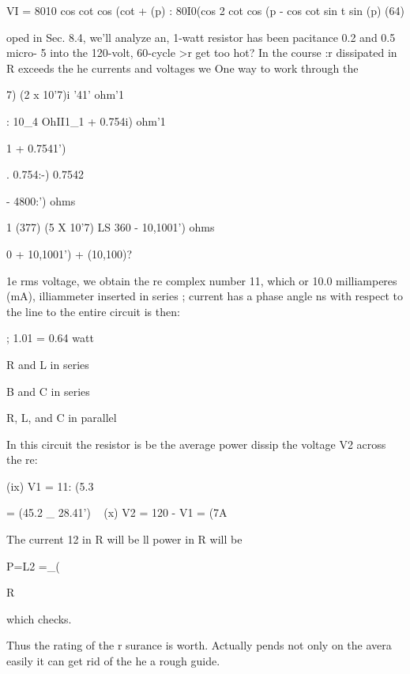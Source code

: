 \begin{equation}
\end{equation}
VI = 8010 cos cot cos (cot + (p)
: 80I0(cos 2 cot cos (p - cos cot sin \omega t sin (p) (64)

oped in Sec. 8.4, we'll analyze
an, 1-watt resistor has been
pacitance 0.2 and 0.5 micro-
5 into the 120-volt, 60-cycle
>r get too hot? In the course
:r dissipated in R exceeds the
he currents and voltages we
One way to work through the

7) (2 x 10'7)i
'41' ohm'1

: 10_4 OhII1_1
+ 0.754i) ohm'1

1
+ 0.7541')

. 0.754:-)
0.7542

- 4800:') ohms

1
(377) (5 X 10'7)
LS
360 - 10,1001') ohms

0 + 10,1001')
+ (10,100)?

1e rms voltage, we obtain the
re complex number 11, which
or 10.0 milliamperes (mA),
illiammeter inserted in series
; current has a phase angle
ns with respect to the line
to the entire circuit is then:

; 1.01 = 0.64 watt

R and L in series

B and C in series

R, L, and C in parallel

In this circuit the resistor is
be the average power dissip
the voltage V2 across the re:

\begin{equation}
\end{equation}
(ix) V1 = 11: (5.3

= (45.2 _ 28.41') ~
(x) V2 = 120 - V1 = (7A

The current 12 in R will be ll
power in R will be

\begin{equation}
\end{equation}
P=L2 =_(

R

which checks.

Thus the rating of the r
surance is worth. Actually
pends not only on the avera
easily it can get rid of the he
a rough guide.

\fi
